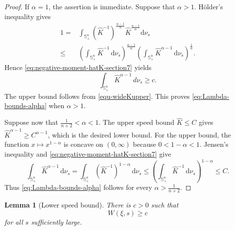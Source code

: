 \documentclass[11pt, reqno]{amsart}
\newtheorem{lemma}[theorem]{Lemma}
\theoremstyle{remark}
\theoremstyle{definition}
\numberwithin{equation}{section}
\begin{document}
\begin{proof}
If $\alpha=1$, the assertion is immediate.  Suppose that $\alpha>1$.  H\"older's inequality gives
\begin{align*}
    1 =& \int_{\mathbb{S}_+^n} (\widehat{K}^{-1})^{\frac{\alpha-1}{\alpha}} \widehat{K}^{\frac{\alpha-1}{\alpha}} \mathrm{d}\nu_s \\
    \le & \left( \int_{\mathbb{S}_+^n} \widehat{K}^{-1}\,\mathrm{d}\nu_s \right)^{\frac{\alpha-1}{\alpha}} \left( \int_{\mathbb{S}_+^n} \widehat{K}^{\alpha-1}\,\mathrm{d}\nu_s \right)^{\frac{1}{\alpha}}.
\end{align*}
Hence \eqref{eq:negative-moment-hatK-section7} yields
\begin{equation*}
        \int_{\mathbb{S}_+^n}\widehat K^{\alpha-1}\,d\nu_s\ge c .
\end{equation*}
The upper bound follows from \eqref{equ-wideKupper}.  This proves \eqref{eq:Lambda-bounds-alpha} when $\alpha>1$.

Suppose now that $\frac{1}{n+2} < \alpha < 1$.
The upper speed bound $\widehat{K} \le C$ gives
$\widehat{K}^{\alpha-1} \ge C^{\alpha-1}$, which is the desired lower bound.  For the upper bound, the function $x \mapsto x^{1-\alpha}$ is concave on $(0,\infty)$ because $0 < 1-\alpha < 1$.  Jensen's inequality and \eqref{eq:negative-moment-hatK-section7} give
\begin{equation*}
    \int_{\mathbb{S}_+^n} \widehat{K}^{\alpha-1}\,\mathrm{d}\nu_s
    = \int_{\mathbb{S}_+^n} (\widehat{K}^{-1})^{1-\alpha}\,\mathrm{d}\nu_s
    \le \left( \int_{\mathbb{S}_+^n} \widehat{K}^{-1}\,\mathrm{d}\nu_s \right)^{1-\alpha}
    \le C .
\end{equation*}
Thus \eqref{eq:Lambda-bounds-alpha} follows for every $\alpha > \frac{1}{n+2}$.
\end{proof}

\begin{lemma}[Lower speed bound]\label{prop:F-lower-alpha}
There is $c>0$ such that
\begin{equation}\label{eq:F-lower-alpha}
       W(\xi,s)\ge c
\end{equation}
for all $s$ sufficiently large.
\end{lemma}
\end{document}
